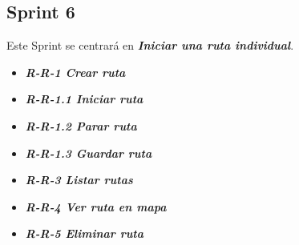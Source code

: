 \subsection{Sprint 6}
Este Sprint se centrará en \textbf{\textit{Iniciar una ruta individual}}.

\begin{itemize}
\item \textbf{\textit{R-R-1 Crear ruta}}
\item \textbf{\textit{R-R-1.1 Iniciar ruta}}
\item\textbf{ \textit{R-R-1.2 Parar ruta}}
\item \textbf{\textit{R-R-1.3 Guardar ruta}}
\item \textbf{\textit{R-R-3 Listar rutas} }
\item \textbf{\textit{R-R-4 Ver ruta en mapa}}
\item \textbf{\textit{R-R-5 Eliminar ruta}}
\end{itemize}

